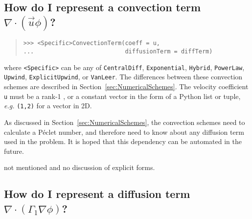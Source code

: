             \subsection{How do I represent a convection term
            $\nabla \cdot \left( \vec{u} \phi \right)$?}
            \hspace*{\fill}
            
            \begin{quote}
\begin{verbatim}
>>> <Specific>ConvectionTerm(coeff = u, 
...                          diffusionTerm = diffTerm)
\end{verbatim}
            \end{quote}
            where \verb|<Specific>| can be any of \verb|CentralDiff|,
            \verb|Exponential|, \verb|Hybrid|, \verb|PowerLaw|,
            \verb|Upwind|, \verb|ExplicitUpwind|, or \verb|VanLeer|.
            The differences between these convection schemes are described
            in Section~\ref{sec:NumericalSchemes}. The velocity coefficient 
            \verb|u| must be a rank-1 , or a 
            constant vector in the form of a Python list or tuple, 
            \emph{e.g.} \verb|(1,2)| for a vector in 2D.
            
            \begin{reSTadmonition}[Note]
                As discussed in Section~\ref{sec:NumericalSchemes}, the
                convection schemes need to calculate a P\'eclet number,
                and therefore need to know about any diffusion term
                used in the problem.  It is hoped that this dependency
                can be automated in the future.
            \end{reSTadmonition}
            
            \begin{reSTadmonition}[Warning]
                 not mentioned and no discussion of
                explicit forms.
            \end{reSTadmonition}
        
            \subsection{How do I represent a diffusion term
            $\nabla \cdot \left( \Gamma_1 \nabla \phi \right)$?}
            \hspace*{\fill}
            
